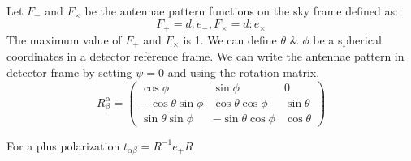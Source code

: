 \documentclass{ttuthes2007}
\begin{document}
Let $F_+$ and $F_\times$ be the antennae pattern functions on the sky frame
defined as:
\begin{equation}
F_+=d:e_+,  F_\times=d:e_\times
\end{equation}
The maximum value of $F_+$ and $F_\times$ is 1. We can define $\theta$ \&
$\phi$ be a spherical coordinates in a detector reference frame. We can write
the antennae pattern in detector frame by setting $\psi=0$ and using the
rotation matrix.
\begin{equation*}                                                               
R_\beta^\alpha=                                                                  
 \begin{pmatrix}                                                                
    \cos\phi & \sin\phi & 0 \\                                                            
    -\cos\theta \sin\phi & \cos\theta \cos\phi & \sin\theta \\                                                            
    \sin\theta \sin\phi & -\sin\theta \cos\phi & \cos\theta                                                              
 \end{pmatrix}                                                                  
\end{equation*}   

For a plus polarization $t_{\alpha\beta}= R^{-1}e_+R$
\end{document}
